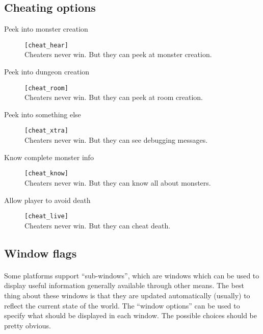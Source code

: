 \subsection{Cheating options}
\begin{description}
\item[Peek into monster creation] \verb+[cheat_hear]+\\
    Cheaters never win. But they can peek at monster creation.

\item[Peek into dungeon creation] \verb+[cheat_room]+\\
    Cheaters never win. But they can peek at room creation.

\item[Peek into something else] \verb+[cheat_xtra]+\\
    Cheaters never win. But they can see debugging messages.

\item[Know complete monster info] \verb+[cheat_know]+\\
    Cheaters never win. But they can know all about monsters.

\item[Allow player to avoid death] \verb+[cheat_live]+\\
    Cheaters never win. But they can cheat death.
\end{description}

\subsection{Window flags}
\paragraph{}Some platforms support ``sub-windows'', which are windows
which can be used to display useful information generally available
through other means. The best thing about these windows is that they are
updated automatically (usually) to reflect the current state of the
world. The ``window options'' can be used to specify what should be
displayed in each window. The possible choices should be pretty
obvious.

